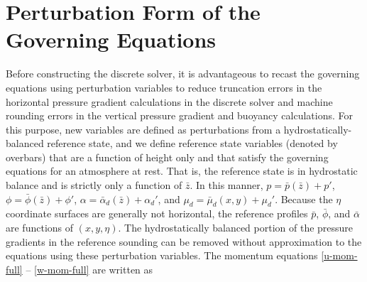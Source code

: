 \section{Perturbation Form of the Governing Equations}

Before constructing the discrete solver, it is advantageous to recast
the governing equations using perturbation variables to reduce
truncation errors in the horizontal pressure gradient calculations in
the discrete solver and machine rounding errors in
the vertical pressure gradient and buoyancy calculations.  
For this purpose, new
variables are defined as perturbations from a hydrostatically-balanced 
reference state, and we define reference state
variables (denoted by overbars) that are a function of height only and
that satisfy the governing equations for an atmosphere at rest.  That is,
the reference state is in hydrostatic balance and is strictly only a
function of $\bar z$.  In this manner, $p=\bar p(\bar z)+p'$, $\phi=\bar
\phi(\bar z)
+\phi'$, $\alpha=\bar \alpha_d(\bar z) +\alpha_d'$, and $\mu_d = \bar\mu_d(x,y) +
\mu_d'$. Because the $\eta$ coordinate surfaces are generally not
horizontal, the reference profiles $\bar p$, $\bar\phi$, and
$\bar\alpha$ are functions of $(x,y,\eta)$. 
The hydrostatically balanced portion of the pressure gradients in the
reference sounding can be removed without approximation to the equations
using these perturbation variables.
The momentum equations 
\eqref{u-mom-full} -- \eqref{w-mom-full} are written as
%
